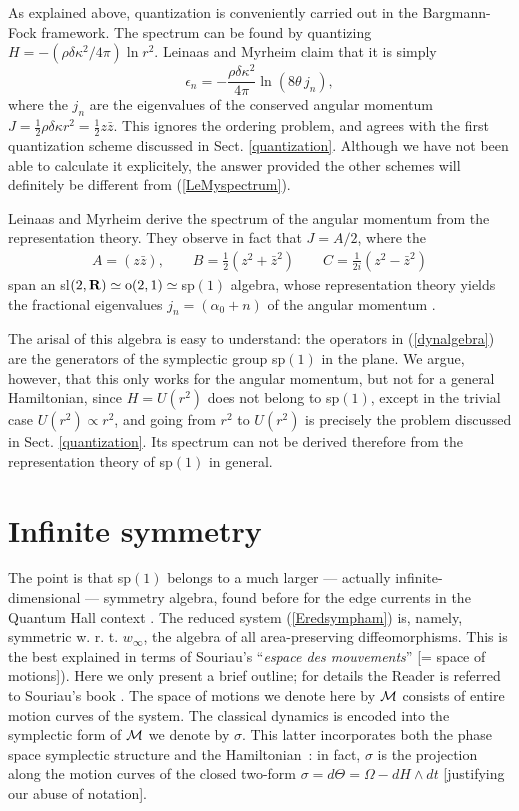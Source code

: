 \documentclass[a4paper,11pt]{article}
\let\ssection=\section
\renewcommand{\section}{\setcounter{equation}{0}\ssection}
\newcommand{\half}{{\scriptstyle{\frac{1}{2}}}}
\newcommand{\IR}{{\bf R}}
\begin{document}
As explained above, quantization is conveniently carried out in the
Bargmann-Fock
framework.
The spectrum can be found by quantizing
  $H=-(\rho\delta\kappa^2/4\pi)\ln r^2$. Leinaas and Myrheim claim
that it is simply
\begin{equation}
\epsilon_{n}=-\frac{\rho\delta\kappa^2}{4\pi}\ln(8\theta\, j_{n}),
\label{LeMyspectrum}
\end{equation}
where the $j_{n}$ are the eigenvalues of the
  conserved angular momentum
$
J=\half\rho\delta\kappa r^2=\half z\bar{z}.
$
This ignores the ordering problem, and
agrees with the first quantization scheme discussed in
Sect. \ref{quantization}.
Although we have not been able to
calculate it explicitely, the answer provided the other schemes
will definitely be different from
(\ref{LeMyspectrum}).

Leinaas and Myrheim derive the spectrum of the angular momentum
  from the representation theory. They observe in fact
that $J=A/2$, where the
\begin{eqnarray}
     A=(z\bar{z}),
     \qquad
     B=\frac{1}{2}(z^2+\bar{z}^2)
     \qquad
     C=\frac{1}{2i}(z^2-\bar{z}^2)
     \label{dynalgebra}
\end{eqnarray}
span an sl$(2,\IR)\simeq{\rm o}(2,1)\simeq$\,sp$(1)$ algebra,
whose representation
theory yields  the fractional eigenvalues
$j_{n}=(\alpha_{0}+n)$ of the angular momentum \cite{LeMy}.

The arisal of this algebra is easy to
understand: the operators in (\ref{dynalgebra}) are the generators
of the symplectic group sp$(1)$ in the plane.
We argue, however, that this only works for the angular
momentum, but not for a general Hamiltonian, since
$H=U(r^2)$ does not belong to sp$(1)$,
except in the trivial case $U(r^2)\propto r^2$, and going from
$r^2$ to $U(r^2)$ is precisely the problem discussed in
Sect. \ref{quantization}.
Its spectrum can not
be derived therefore from the representation theory of sp$(1)$ in general.

\section{Infinite symmetry}

The point is that sp$(1)$ belongs to a much
larger --- actually infinite-dimensional --- symmetry algebra,
found before for the edge currents
in the Quantum Hall context  \cite{Winfty}.
The reduced system (\ref{Eredsympham})
is, namely, symmetric w. r. t.
  $w_{\infty}$, the algebra of all area-preserving diffeomorphisms.
   This is the best explained in terms of Souriau's
``{\it espace des mouvements}'' [= space of motions]).
Here we only present a brief outline;
for details the Reader is referred to
Souriau's book \cite{SSD}.
The space of motions we denote here by ${\cal M}$
consists of entire motion curves of the system. The classical
dynamics is encoded into the symplectic form of ${\cal M}$ we denote
by $\sigma$. This latter incorporates both the phase space
symplectic structure and the Hamiltonian~: in fact, $\sigma$ is the
projection along the motion curves of the closed two-form $\sigma=
d\Theta=\Omega-dH\wedge dt$ [justifying our abuse of notation].
\end{document}
